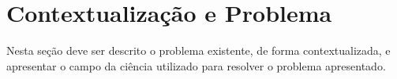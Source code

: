 


\section{Contextualização e Problema}
    \label{sec:contextualizacao-e-problema}
    
    Nesta seção deve ser descrito o problema existente, de forma contextualizada, e apresentar o campo da ciência utilizado para resolver o problema apresentado.
    
    
    